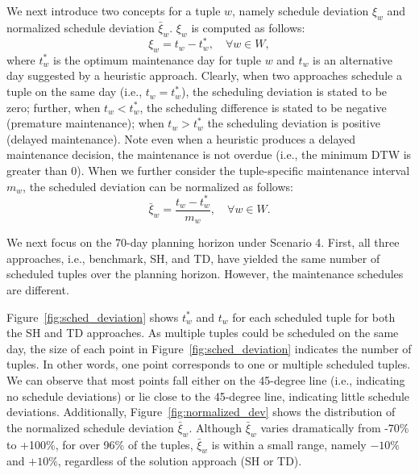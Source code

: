 We next introduce two concepts for a tuple $w$, namely schedule deviation $\xi_w$ and normalized schedule deviation $\bar{\xi}_w$. $\xi_w$ is computed as follows:
\begin{equation}
    \xi_w =  t_w - t_w^*, \quad \forall w \in W,
\end{equation}
where $t_w^*$ is the optimum maintenance day for tuple $w$ and $t_w$ is an alternative day suggested by a heuristic approach. Clearly, when two approaches schedule a tuple on the same day (i.e.,  $t_w = t_w^*$), the scheduling deviation is stated to be zero; further, when $t_w < t_w^*$, the scheduling difference is stated to be negative (premature maintenance); when $t_w > t_w^*$ the scheduling deviation is positive (delayed maintenance). Note even when a heuristic produces a delayed maintenance decision, the maintenance is not overdue (i.e., the minimum DTW is greater than 0). When we further consider the tuple-specific maintenance interval $m_w$, the scheduled deviation can be normalized as follows:
\begin{equation}
    \bar{\xi}_w =  \frac{t_w - t_w^*}{m_w}, \quad \forall w \in W.
\end{equation}

We next focus on the 70-day planning horizon under Scenario 4. First, all three approaches, i.e., benchmark, SH, and TD, have yielded the same number of scheduled tuples over the planning horizon. However, the maintenance schedules are different.

Figure~\ref{fig:sched_deviation} shows $t_w^*$ and $t_w$ for each scheduled tuple for both the SH and TD approaches. As multiple tuples could be scheduled on the same day, the size of each point in Figure~\ref{fig:sched_deviation} indicates the number of tuples. In other words, one point corresponds to one or multiple scheduled tuples. We can observe that most points fall either on the 45-degree line (i.e., indicating no schedule deviations) or lie close to the 45-degree line, indicating little schedule deviations. Additionally, Figure~\ref{fig:normalized_dev} shows the distribution of the normalized schedule deviation $\bar{\xi}_w$. Although $\bar{\xi}_w$ varies dramatically from -70\% to +100\%, for over 96\% of the tuples, $\bar{\xi}_w$ is within a small range, namely $-10\%$ and $+10\%$, regardless of the solution approach (SH or TD).


